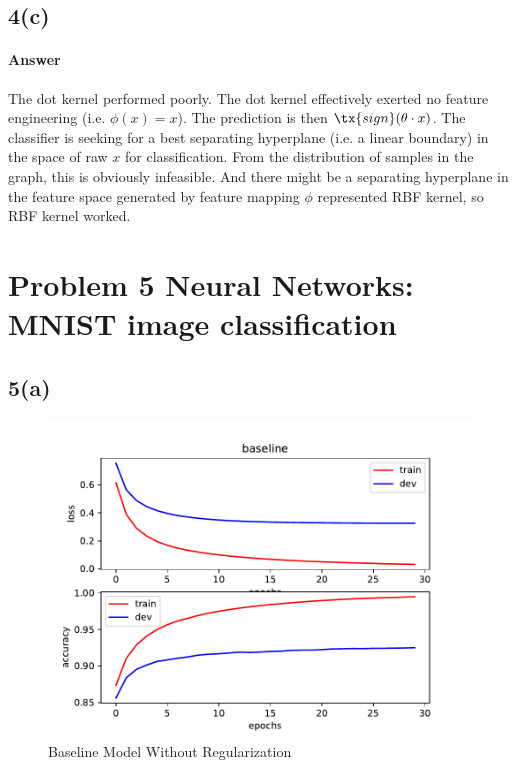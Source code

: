 \documentclass[11pt]{article}
\begin{document}
	\newpage
	\subsection{4(c)}
	\paragraph{Answer} The dot kernel performed poorly. The dot kernel effectively exerted no feature engineering (i.e. $\phi(x) = x$). The prediction is then $\tx{sign}(\theta \cdot x)$. The classifier is seeking for a best separating hyperplane (i.e. a linear boundary) in the space of raw $x$ for classification. From the distribution of samples in the graph, this is obviously infeasible. And there might be a separating hyperplane in the feature space generated by feature mapping $\phi$ represented RBF kernel, so RBF kernel worked.
	
	\newpage
	\section{Problem 5 Neural Networks: MNIST image classification}
	\subsection{5(a)}
	\begin{figure}[h]
		\centering
		\includegraphics{src/mnist/baseline.pdf}
		\caption{Baseline Model Without Regularization}
	\end{figure}
	
	\newpage
\end{document}
